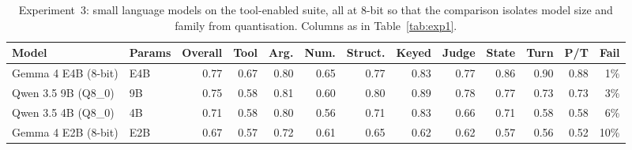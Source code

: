 \begin{table}[!t]
\centering
\caption{Experiment~3: small language models on the tool-enabled suite, all at 8-bit so that the comparison isolates model size and family from quantisation. Columns as in Table~\ref{tab:exp1}.}
\label{tab:exp2}
\small
\setlength{\tabcolsep}{4pt}
\begin{tabular}{@{}ll rrrrrrrrrrr@{}}
\toprule
Model & Params & Overall & Tool & Arg. & Num. & Struct. & Keyed & Judge & State & Turn & P/T & Fail \\
\midrule
Gemma 4 E4B (8-bit) & E4B & 0.77 & 0.67 & 0.80 & 0.65 & 0.77 & 0.83 & 0.77 & 0.86 & 0.90 & 0.88 & 1\% \\
Qwen 3.5 9B (Q8\_0) & 9B & 0.75 & 0.58 & 0.81 & 0.60 & 0.80 & 0.89 & 0.78 & 0.77 & 0.73 & 0.73 & 3\% \\
Qwen 3.5 4B (Q8\_0) & 4B & 0.71 & 0.58 & 0.80 & 0.56 & 0.71 & 0.83 & 0.66 & 0.71 & 0.58 & 0.58 & 6\% \\
Gemma 4 E2B (8-bit) & E2B & 0.67 & 0.57 & 0.72 & 0.61 & 0.65 & 0.62 & 0.62 & 0.57 & 0.56 & 0.52 & 10\% \\
\bottomrule
\end{tabular}
\end{table}
